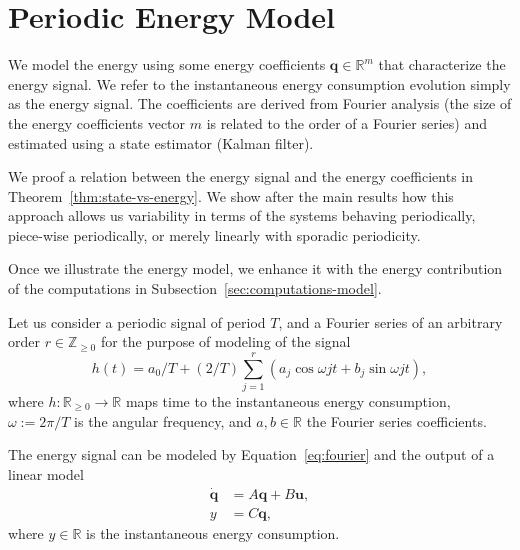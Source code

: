 \documentclass[letterpaper,10pt,conference]{ieeeconf}
\theoremstyle{definition}
\begin{document}
\section{Periodic Energy Model}
\label{sec:energy-model}

We model the energy using some energy coefficients $\mathbf{q}\in\mathbb{R}^m$ that characterize the energy signal. We refer to the instantaneous energy consumption evolution simply as the energy signal. The coefficients are derived from Fourier analysis (the size of the energy coefficients vector $m$ is related to the order of a Fourier series) and estimated using a state estimator (Kalman filter). 

We proof a relation between the energy signal and the energy coefficients in Theorem~\ref{thm:state-vs-energy}. We show after the main results how this approach allows us variability in terms of the systems behaving periodically, piece-wise periodically, or merely linearly with sporadic periodicity.

Once we illustrate the energy model, we enhance it with the energy contribution of the computations in Subsection~\ref{sec:computations-model}. 

Let us consider a periodic signal of period $T$, and a Fourier series of an arbitrary order $r\in\mathbb{Z}_{\geq 0}$ for the purpose of modeling of the signal
\begin{equation}\label{eq:fourier}
  h(t)=a_0/T+(2/T)\sum_{j=1}^{r}{\left(a_j\cos{\omega jt}+b_j\sin{\omega jt}\right)},
\end{equation}
where $h:\mathbb{R}_{\geq 0}\rightarrow\mathbb{R}$ maps time to the instantaneous energy consumption, $\omega:=2\pi/T$ is the angular frequency, and $a,b\in\mathbb{R}$ the Fourier series coefficients.

The energy signal can be modeled by Equation~\ref{eq:fourier} and the output of a linear model
\begin{equation}\label{eq:state-perf}\begin{split}
  \dot{\mathbf{q}}&=A\mathbf{q}+B\mathbf{u},\\
  y&=C\mathbf{q},
\end{split}\end{equation}
where $y\in\mathbb{R}$ is the instantaneous energy consumption. 
\end{document}
